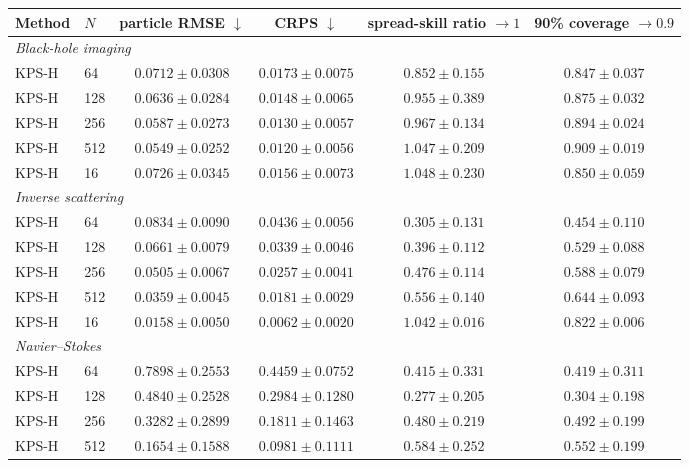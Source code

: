 \small
\begin{tabular}{llcccc}
\toprule
Method & $N$ & \shortstack{particle\\RMSE $\downarrow$} & \shortstack{CRPS\\$\downarrow$} & \shortstack{spread-skill\\ratio $\to 1$} & \shortstack{90\% coverage\\$\to 0.9$} \\
\midrule
\multicolumn{6}{l}{\itshape Black-hole imaging} \\
KPS-H & 64 & $0.0712 \pm 0.0308$ & $0.0173 \pm 0.0075$ & $0.852 \pm 0.155$ & $0.847 \pm 0.037$ \\
KPS-H & 128 & $0.0636 \pm 0.0284$ & $0.0148 \pm 0.0065$ & $0.955 \pm 0.389$ & $0.875 \pm 0.032$ \\
KPS-H & 256 & $0.0587 \pm 0.0273$ & $0.0130 \pm 0.0057$ & $0.967 \pm 0.134$ & $0.894 \pm 0.024$ \\
KPS-H & 512 & $0.0549 \pm 0.0252$ & $0.0120 \pm 0.0056$ & $1.047 \pm 0.209$ & $0.909 \pm 0.019$ \\
KPS-H & 16 & $0.0726 \pm 0.0345$ & $0.0156 \pm 0.0073$ & $1.048 \pm 0.230$ & $0.850 \pm 0.059$ \\
\midrule
\multicolumn{6}{l}{\itshape Inverse scattering} \\
KPS-H & 64 & $0.0834 \pm 0.0090$ & $0.0436 \pm 0.0056$ & $0.305 \pm 0.131$ & $0.454 \pm 0.110$ \\
KPS-H & 128 & $0.0661 \pm 0.0079$ & $0.0339 \pm 0.0046$ & $0.396 \pm 0.112$ & $0.529 \pm 0.088$ \\
KPS-H & 256 & $0.0505 \pm 0.0067$ & $0.0257 \pm 0.0041$ & $0.476 \pm 0.114$ & $0.588 \pm 0.079$ \\
KPS-H & 512 & $0.0359 \pm 0.0045$ & $0.0181 \pm 0.0029$ & $0.556 \pm 0.140$ & $0.644 \pm 0.093$ \\
KPS-H & 16 & $0.0158 \pm 0.0050$ & $0.0062 \pm 0.0020$ & $1.042 \pm 0.016$ & $0.822 \pm 0.006$ \\
\midrule
\multicolumn{6}{l}{\itshape Navier--Stokes} \\
KPS-H & 64 & $0.7898 \pm 0.2553$ & $0.4459 \pm 0.0752$ & $0.415 \pm 0.331$ & $0.419 \pm 0.311$ \\
KPS-H & 128 & $0.4840 \pm 0.2528$ & $0.2984 \pm 0.1280$ & $0.277 \pm 0.205$ & $0.304 \pm 0.198$ \\
KPS-H & 256 & $0.3282 \pm 0.2899$ & $0.1811 \pm 0.1463$ & $0.480 \pm 0.219$ & $0.492 \pm 0.199$ \\
KPS-H & 512 & $0.1654 \pm 0.1588$ & $0.0981 \pm 0.1111$ & $0.584 \pm 0.252$ & $0.552 \pm 0.199$ \\
\bottomrule
\end{tabular}
